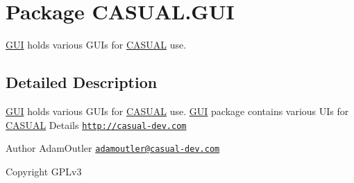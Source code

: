 \hypertarget{namespace_c_a_s_u_a_l_1_1_g_u_i}{\section{Package C\-A\-S\-U\-A\-L.\-G\-U\-I}
\label{namespace_c_a_s_u_a_l_1_1_g_u_i}
}


\hyperlink{namespace_c_a_s_u_a_l_1_1_g_u_i}{G\-U\-I} holds various G\-U\-Is for \hyperlink{namespace_c_a_s_u_a_l}{C\-A\-S\-U\-A\-L} use.  




\subsection{Detailed Description}
\hyperlink{namespace_c_a_s_u_a_l_1_1_g_u_i}{G\-U\-I} holds various G\-U\-Is for \hyperlink{namespace_c_a_s_u_a_l}{C\-A\-S\-U\-A\-L} use. \hyperlink{namespace_c_a_s_u_a_l_1_1_g_u_i}{G\-U\-I} package contains various U\-Is for \hyperlink{namespace_c_a_s_u_a_l}{C\-A\-S\-U\-A\-L} Details \href{http://casual-dev.com}{\tt http\-://casual-\/dev.\-com} \begin{DoxyAuthor}{Author}
Adam\-Outler \href{mailto:adamoutler@casual-dev.com}{\tt adamoutler@casual-\/dev.\-com} 
\end{DoxyAuthor}
\begin{DoxyCopyright}{Copyright}
G\-P\-Lv3 
\end{DoxyCopyright}
